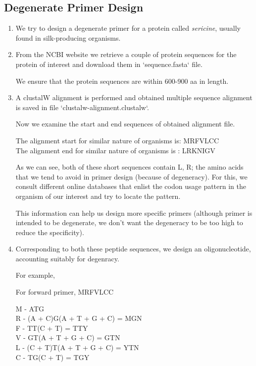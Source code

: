 \documentclass[12pt,a4paper]{report}
\begin{document}
\subsection*{Degenerate Primer Design}
\begin{enumerate}
    \item We try to design a degenerate primer for a protein called 
    \textit{sericine},
    usually found in silk-producing organisms.
    \item From the NCBI website we retrieve a couple of protein sequences
    for the protein of interest and download them in `sequence.fasta` file.
    
    We ensure that the protein sequences are within 600-900 aa in length.
    \item A clustalW alignment is performed and obtained multiple sequence 
    alignment is saved in file `clustalw-alignment.clustalw`.


Now we examine the start and end sequences of obtained alignment file.

The alignment start for similar nature of organisms is: MRFVLCC\\
The alignment end for similar nature of organisms is  : LRKNIGV

As we can see, both of these short sequences contain L, R; the amino acids
that we tend to avoid in primer design (because of degeneracy). For this, we
consult different online databases that enlist the codon usage pattern in
the organism of our interest and try to locate the pattern.

This information can help us design more specific primers (although primer
is intended to be degenerate, we don't want the degeneracy to be too high to
reduce the specificity).

\item Corresponding to both these peptide sequences, we design an 
oligonucleotide,
accounting suitably for degenracy.

For example,

For forward primer, MRFVLCC

M - ATG\\
R - (A + C)G(A + T + G + C)  = MGN\\
F - TT(C + T)                = TTY\\
V - GT(A + T + G + C)        = GTN\\
L - (C + T)T(A + T + G + C)  = YTN\\
C - TG(C + T)                = TGY\\


\end{enumerate}
\end{document}
